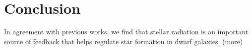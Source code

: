 \documentclass[twocolumn]{aastex62}
\begin{document}
\section{Conclusion}  \label{sec:conclusion}
In agreement with previous works, we find that stellar radiation is an important source of feedback that helps regulate star formation in dwarf galaxies. (more)



\end{document}
